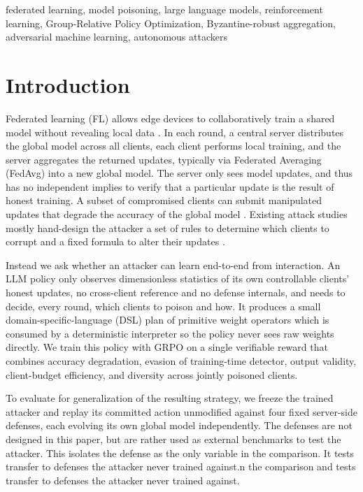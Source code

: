 \documentclass[conference,9pt]{IEEEtran}
\begin{document}
\begin{IEEEkeywords}
federated learning, model poisoning, large language models, reinforcement learning, Group-Relative Policy Optimization, Byzantine-robust aggregation, adversarial machine learning, autonomous attackers
\end{IEEEkeywords}

\section{Introduction}

Federated learning (FL) allows edge devices to collaboratively train a shared model without revealing local data \cite{fedavg}. In each round, a central server distributes the global model across all clients, each client performs local training, and the server aggregates the returned updates, typically via Federated Averaging (FedAvg) into a new global model. The server only sees model updates, and thus has no independent implies to verify that a particular update is the result of honest training. A subset of compromised clients can submit manipulated updates that degrade the accuracy of the global model \cite{bagdasaryan2020,bhagoji2019}. Existing attack studies mostly hand-design the attacker a set of rules to determine which clients to corrupt and a fixed formula to alter their updates \cite{fang2020,xie2020fallofempires,baruch2019little}. 

Instead we ask whether an attacker can learn end-to-end from interaction. An LLM policy only observes dimensionless statistics of its own controllable clients’ honest updates, no cross-client reference and no defense internals, and needs to decide, every round, which clients to poison and how. It produces a small domain-specific-language (DSL) plan of primitive weight operators which is consumed by a deterministic interpreter so the policy never sees raw weights directly. We train this policy with GRPO \cite{grpo} on a single verifiable reward that combines accuracy degradation, evasion of training-time detector, output validity, client-budget efficiency, and diversity across jointly poisoned clients.

 To evaluate for generalization of the resulting strategy, we freeze the trained attacker and replay its committed action unmodified against four fixed server-side defenses, each evolving its own global model independently. The defenses are not designed in this paper, but are rather used as external benchmarks to test the attacker. This isolates the defense as the only variable in the comparison. It tests transfer to defenses the attacker never trained against.n the comparison and tests transfer to defenses the attacker never trained against.
\end{document}
